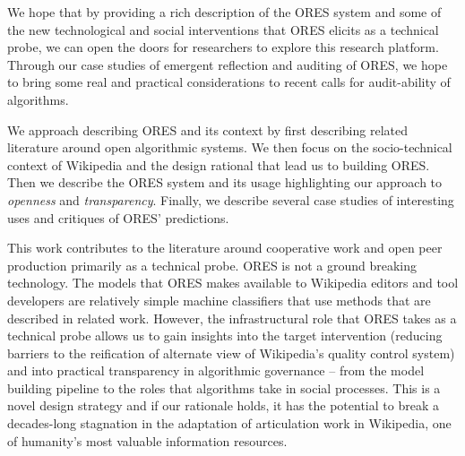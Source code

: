 We hope that by providing a rich description of the ORES system and some of the new technological and social interventions that ORES elicits as a technical probe\cite{hutchinson2003technology}, we can open the doors for researchers to explore this research platform\cite{terveen2014study}.  Through our case studies of emergent reflection and auditing of ORES, we hope to bring some real and practical considerations to recent calls for audit-ability of algorithms\cite{sandvig2014auditing}.

We approach describing ORES and its context by first describing related literature around open algorithmic systems.  We then focus on the socio-technical context of Wikipedia and the design rational that lead us to building ORES.  Then we describe the ORES system and its usage highlighting our approach to \emph{openness} and \emph{transparency}.  Finally, we describe several case studies of interesting uses and critiques of ORES' predictions.

This work contributes to the literature around cooperative work and open peer production primarily as a technical probe.  ORES is not a ground breaking technology.  The models that ORES makes available to Wikipedia editors and tool developers are relatively simple machine classifiers that use methods that are described in related work.  However, the infrastructural role that ORES takes as a technical probe allows us to gain insights into the target intervention (reducing barriers to the reification of alternate view of Wikipedia's quality control system) and into practical transparency in algorithmic governance -- from the model building pipeline to the roles that algorithms take in social processes.  This is a novel design strategy and if our rationale holds, it has the potential to break a decades-long stagnation in the adaptation of articulation work in Wikipedia, one of humanity's most valuable information resources.
